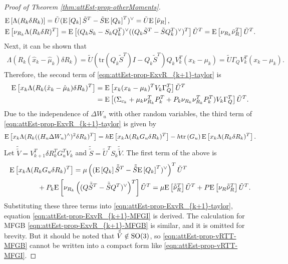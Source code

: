 \begin{proof}[Proof of Theorem \ref{thm:attEst-prop-otherMoments}]
\begin{align*}
		&\mathrm{E}\left[ \Lambda( R_k\delta R_k ) \right] = \tilde{U} (\mathrm{E}\left[ Q_k \right]\tilde{S}^T-\tilde{S}\mathrm{E}\left[ Q_k \right]^T)^\vee = \tilde{U}\mathrm{E}\left[ \tilde{\nu}_R \right], \\
		&\mathrm{E}\left[ \nu_{R_k} \Lambda( R_k\delta R )^T \right] = \mathrm{E}\left[ (Q_k S_k-S_kQ_k^T)^\vee ( (Q_k\tilde{S}^T-\tilde{S}Q_k^T)^\vee )^T \right] \tilde{U}^T = \mathrm{E}\left[ \nu_{R_k} \tilde{\nu}^T_R \right]\tilde{U}^T.
	\end{align*}
	Next, it can be shown that
	\begin{align*}
		\Lambda ( R_k(\hat{x}_k-\hat{\mu}_k)\delta R_k ) = \tilde{U}\left( \mathrm{tr}(Q_k\tilde{S}^T)I - Q_k\tilde{S}^T \right)Q_kV_k^T(x_k-\mu_k) = \tilde{U}\Gamma_QV_k^T(x_k-\mu_k).
	\end{align*}
	Therefore, the second term of \eqref{eqn:attEst-prop-ExvR_{k+1}-taylor} is
	\begin{align*}
		\mathrm{E}\left[ x_k \Lambda ( R_k(\hat{x}_k-\hat{\mu}_k)\delta R_k )^T \right] &= \mathrm{E}\left[ x_k(x_k-\mu_k)^TV_k\Gamma_Q^T \right]\tilde{U}^T \\
		&= \mathrm{E}\left[ (\Sigma_{c_k} + \mu_k\nu_{R_k}^TP_k^T + P_k\nu_{R_k}\nu_{R_k}^TP_k^T)V_k \Gamma_Q^T \right]\tilde{U}^T.
	\end{align*}
	Due to the independence of $\Delta W_u$ with other random variables, the third term of \eqref{eqn:attEst-prop-ExvR_{k+1}-taylor} is given by
	\begin{align*}
		\mathrm{E}\left[ x_k \Lambda( R_k((H_u\Delta W_u)^\wedge)^2\delta R_k )^T \right] = h\mathrm{E}\left[ x_k\Lambda( R_kG_u\delta R_k )^T \right] - h\mathrm{tr}\left( G_u \right)\mathrm{E}\left[ x_k\Lambda( R_k\delta R_k )^T \right].
	\end{align*}
	Let $\tilde{\tilde{V}} = V_{k+1}^T\delta R_k^T G_u^TV_k$ and $\tilde{\tilde{S}} = \tilde{U}^TS_k\tilde{\tilde{V}}$. 
	The first term of the above is
	\begin{align*}
		&\mathrm{E}\left[ x_k \Lambda( R_kG_u\delta R_k )^T \right] = \mu\left( (\mathrm{E}\left[ Q_k \right]\tilde{\tilde{S}}^T-\tilde{\tilde{S}}\mathrm{E}\left[ Q_k \right]^T)^\vee \right)^T \tilde{U}^T \\
		&\qquad\qquad + P_k\mathrm{E}\left[  \nu_{R_k} \left( (Q\tilde{\tilde{S}}^T-\tilde{\tilde{S}}Q^T)^\vee \right)^T \right]\tilde{U}^T
		= \mu\mathrm{E}\left[ \tilde{\tilde{\nu}}^T_R \right]\tilde{U}^T + P\mathrm{E}\left[ \nu_R\tilde{\tilde{\nu}}^T_R \right]\tilde{U}^T.
	\end{align*}
	Substituting these three terms into \eqref{eqn:attEst-prop-ExvR_{k+1}-taylor}, equation \eqref{eqn:attEst-prop-ExvR_{k+1}-MFGI} is derived.
	The calculation for MFGB \eqref{eqn:attEst-prop-ExvR_{k+1}-MFGB} is similar, and it is omitted for brevity.
	But it should be noted that $\tilde{\tilde{V}} \notin \mathrm{SO}(3)$, so \eqref{eqn:attEst-prop-vRTT-MFGB} cannot be written into a compact form like \eqref{eqn:attEst-prop-vRTT-MFGI}.
	

\end{proof}
